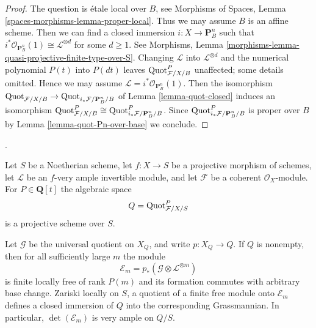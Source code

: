 \begin{proof}
The question is \'etale local over $B$, see
Morphisms of Spaces, Lemma \ref{spaces-morphisms-lemma-proper-local}.
Thus we may assume $B$ is an affine scheme.
Then we can find a closed immersion $i : X \to \mathbf{P}^n_B$
such that $i^*\mathcal{O}_{\mathbf{P}^n_B}(1) \cong \mathcal{L}^{\otimes d}$
for some $d \geq 1$. See
Morphisms, Lemma \ref{morphisms-lemma-quasi-projective-finite-type-over-S}.
Changing $\mathcal{L}$ into $\mathcal{L}^{\otimes d}$ and
the numerical polynomial $P(t)$ into $P(dt)$ leaves
$\mathrm{Quot}^P_{\mathcal{F}/X/B}$ unaffected; some details omitted.
Hence we may assume $\mathcal{L} = i^*\mathcal{O}_{\mathbf{P}^n_B}(1)$.
Then the isomorphism
$\mathrm{Quot}_{\mathcal{F}/X/B} \to
\mathrm{Quot}_{i_*\mathcal{F}/\mathbf{P}^n_B/B}$ of
Lemma \ref{lemma-quot-closed} induces an isomorphism
$\mathrm{Quot}^P_{\mathcal{F}/X/B} \cong
\mathrm{Quot}^P_{i_*\mathcal{F}/\mathbf{P}^n_B/B}$.
Since $\mathrm{Quot}^P_{i_*\mathcal{F}/\mathbf{P}^n_B/B}$
is proper over $B$ by Lemma \ref{lemma-quot-Pn-over-base}
we conclude.
\end{proof}

\begin{proposition}
\label{proposition-quot-projective-over-base}
\begin{reference}
\cite[Expos\'e 221, Theorem 3.2 and Proposition 3.8,
pp. 260--266]{FGA}.
\end{reference}
Let $S$ be a Noetherian scheme, let $f : X \to S$ be a projective
morphism of schemes, let $\mathcal{L}$ be an $f$-very ample invertible
module, and let $\mathcal{F}$ be a coherent $\mathcal{O}_X$-module.
For $P \in \mathbf{Q}[t]$ the algebraic space
$$
Q = \mathrm{Quot}^P_{\mathcal{F}/X/S}
$$
is a projective scheme over $S$.

Let $\mathcal{G}$ be the universal quotient on $X_Q$, and write
$p : X_Q \to Q$. If $Q$ is nonempty, then for all sufficiently large
$m$ the module
$$
\mathcal{E}_m = p_*(\mathcal{G} \otimes \mathcal{L}^{\otimes m})
$$
is finite locally free of rank $P(m)$ and its formation commutes with
arbitrary base change. Zariski locally on $S$, a quotient of a finite
free module onto $\mathcal{E}_m$ defines a closed immersion of $Q$ into
the corresponding Grassmannian. In particular,
$\det(\mathcal{E}_m)$ is very ample on $Q/S$.
\end{proposition}

